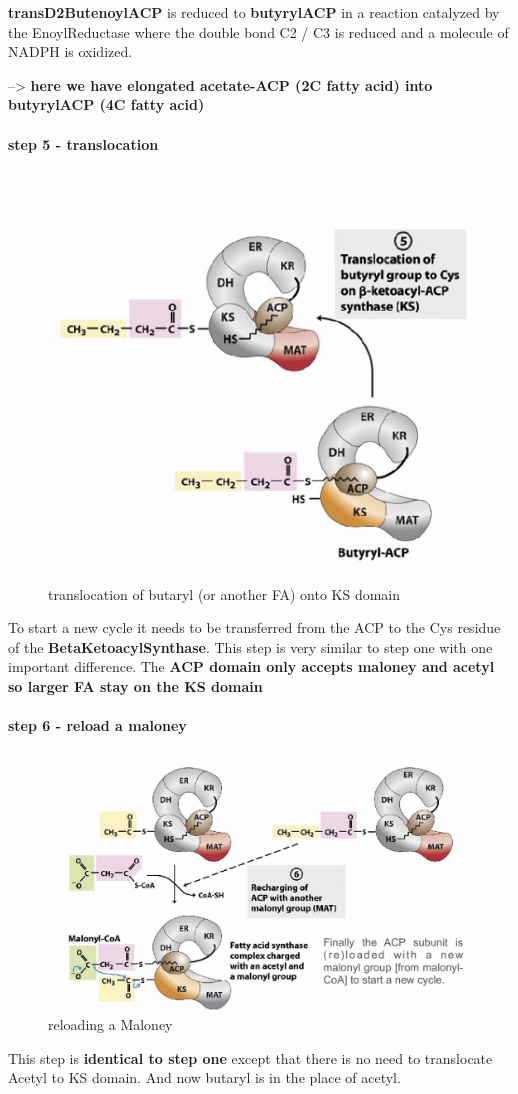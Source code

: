 \documentclass[../main.tex]{subfiles}
\begin{document}
\textbf{\gls{transD2ButenoylACP}} is reduced to \textbf{\gls{butyrylACP}} in a reaction catalyzed by the \gls{EnoylReductase} where the double bond C2 / C3 is reduced and a
molecule of NADPH is oxidized. 

--> \textbf{here we have elongated acetate-ACP (2C fatty acid) into butyrylACP (4C fatty acid)}

\paragraph{step 5 - translocation }
\begin{figure}[H]
    \centering
    \includegraphics[width=0.5\linewidth]{step5.png}
    \caption{translocation of butaryl (or another FA) onto KS domain}
    \label{fig:enter-label}
\end{figure}

 To start a new cycle it 
needs to be transferred from the 
ACP to the Cys residue of the \textbf{\gls{BetaKetoacylSynthase}}. This step is very similar to step one with one important difference. The \textbf{ACP domain only accepts maloney and acetyl so larger FA stay on the KS domain}

\paragraph{step 6 - reload a maloney}
\begin{figure}[H]
    \centering
    \includegraphics[width=0.5\linewidth]{step6.png}
    \caption{reloading a Maloney}
    \label{fig:enter-label}
\end{figure}
This step is \textbf{identical to step one} except that there is no need to translocate Acetyl to KS domain. And now butaryl is in the place of acetyl.
\end{document}

